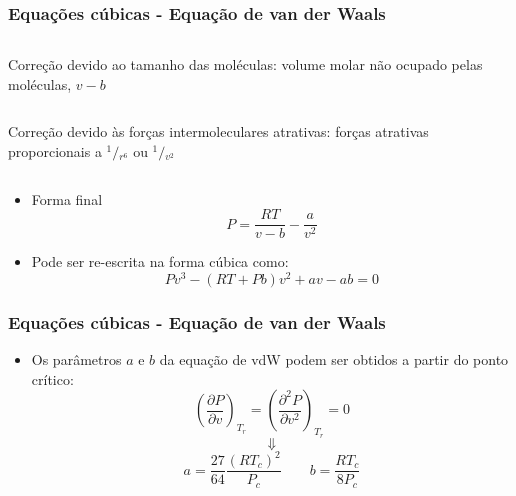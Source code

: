 \documentclass[aspectratio=169]{beamer}
\begin{document}
\begin{frame}
	\frametitle{Equações cúbicas - Equação de van der Waals}
	\begin{columns}
			\begin{exampleblock}{Correção devido ao tamanho das moléculas:}
				volume molar não ocupado pelas moléculas, $v-b$
			\end{exampleblock}
	\end{columns}
	\begin{columns}
		\column{.75\textwidth}
			\begin{exampleblock}{Correção devido às forças intermoleculares
			atrativas:}
			forças atrativas proporcionais a ${}^{1}/{}_{r^6}$ ou
			${}^{1}/{}_{v^2}$
			\end{exampleblock}
	\end{columns}
	\begin{itemize}
		\item Forma final
		\begin{equation*}
		P=\frac{RT}{v-b}-\frac{a}{v^2}
		\end{equation*}
		\item Pode ser re-escrita na forma cúbica como:
		\begin{equation*}
		Pv^3-\left(RT+Pb\right)v^2+av-ab=0
		\end{equation*}
	\end{itemize}
\end{frame}

\begin{frame}
	\frametitle{Equações cúbicas - Equação de van der Waals}
	\begin{itemize}
		\item Os parâmetros $a$ e $b$ da equação de vdW podem ser obtidos a
		partir do ponto crítico: 
		\begin{equation*}
		\left(\frac{\partial P}{\partial v}\right)_{T_r} = \left(\frac{\partial^2
		P}{\partial v^2}\right)_{T_r}=0
		\end{equation*}
		\begin{equation*}
		\Downarrow
		\end{equation*}
		\begin{equation*}
		a=\frac{27}{64}\frac{\left(RT_c\right)^2}{P_c} \qquad
		b=\frac{RT_c}{8P_c} 
		\end{equation*}
	\end{itemize}
\end{frame}
\end{document}
